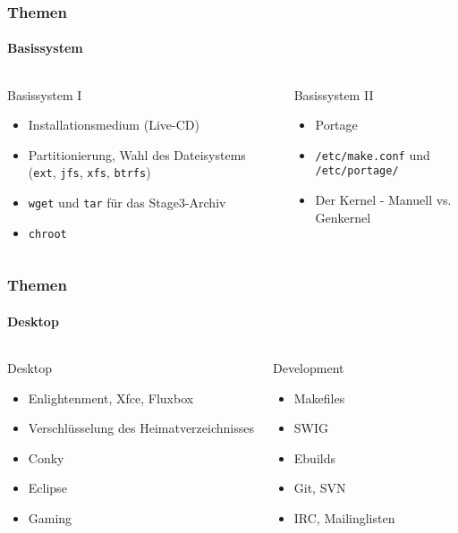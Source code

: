 \documentclass[utf8]{beamer}
\begin{document}
\begin{frame}
\frametitle{Themen}
\framesubtitle{Basissystem}

\begin{columns}
\begin{block}{Basissystem I}
  \begin{itemize}
  \item Installationsmedium (Live-CD)
  \item Partitionierung, Wahl des Dateisystems (\texttt{ext}, \texttt{jfs}, \texttt{xfs}, \texttt{btrfs})
  \item \texttt{wget} und \texttt{tar} für das Stage3-Archiv
  \item \texttt{chroot}
  \end{itemize}
\end{block}

\begin{block}{Basissystem II}
  \begin{itemize}
  \item Portage
  \item \texttt{/etc/make.conf} und \texttt{/etc/portage/}
  \item Der Kernel - Manuell vs. Genkernel
  \end{itemize}
\end{block}
\end{columns}
\end{frame}

\begin{frame}
\frametitle{Themen}
\framesubtitle{Desktop}
\begin{columns}
\begin{block}{Desktop}
  \begin{itemize}
  \item Enlightenment, Xfce, Fluxbox
  \item Verschlüsselung des Heimatverzeichnisses
  \item Conky
  \item Eclipse
  \item Gaming
  \end{itemize}
\end{block}

\begin{block}{Development}
  \begin{itemize}
  \item Makefiles
  \item SWIG
  \item Ebuilds
  \item Git, SVN
  \item IRC, Mailinglisten
  \vspace{25pt}
  \end{itemize}
\end{block}
\end{columns}
\end{frame}
\end{document}
